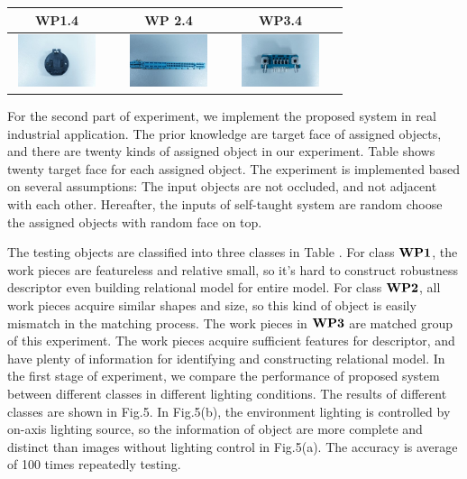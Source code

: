 \documentclass[journal]{IEEEtran}
\begin{document}
\begin{table}[!t]
\begin{center}
\begin{tabular}{|c|c||c|c||c|c|}
\hline
WP1.4 & & WP 2.4 & & WP3.4 &\\
\hline
\includegraphics[width=1in,height=0.6in]{j_img/wp14.jpg} & 
 & 
\includegraphics[width=1in,height=0.6in]{j_img/wp24.jpg} & 
 &
\includegraphics[width=1in,height=0.6in]{j_img/wp34.jpg} & 
\\ 
\hline
\end{tabular}
\end{center}
\end{table}

For the second part of experiment, we implement the proposed system in real industrial application. The prior knowledge are target face of assigned objects, and there are twenty kinds of assigned object in our experiment. Table \uppercase\expandafter{} shows twenty target face for each assigned object. The experiment is implemented based on several assumptions: The input objects are not occluded, and not adjacent with each other. Hereafter, the inputs of self-taught system are random choose the assigned objects with random face on top. 

The testing objects are classified into three classes in Table \uppercase\expandafter{}. For class $\bf{WP1}$, the work pieces are featureless and relative small, so it's hard to construct robustness descriptor even building relational model for entire model. For class $\bf{WP2}$, all work pieces acquire similar shapes and size, so this kind of object is easily mismatch in the matching process. The work pieces in $\bf{WP3}$ are matched group of this experiment. The work pieces acquire sufficient features for descriptor, and have plenty of information for identifying and constructing relational model. In the first stage of experiment, we compare the performance of proposed system between different classes in different lighting conditions.  The results of different classes are shown in Fig.5. In Fig.5(b), the environment lighting is controlled by on-axis lighting source, so the information of object are more complete and distinct than images without lighting control in Fig.5(a). The accuracy is average of 100 times repeatedly testing.
\end{document}
